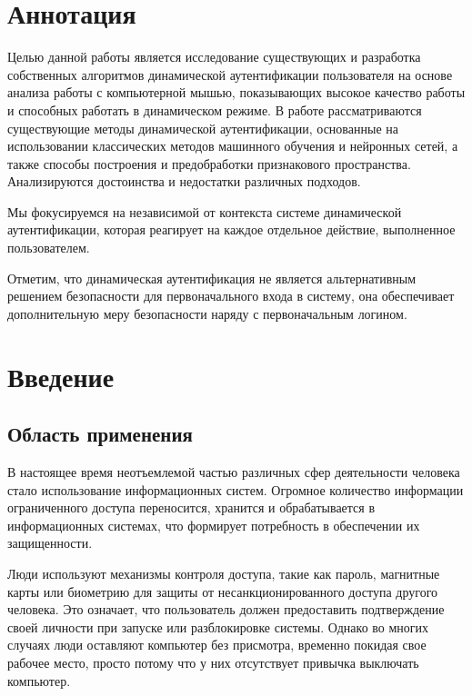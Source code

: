 \documentclass[12pt]{article}
\begin{document}
    \tableofcontents
    \newpage


    \onehalfspacing %


    \section{Аннотация}
    \label{sec:Annotation}

    \par Целью данной работы является исследование существующих и разработка собственных алгоритмов динамической аутентификации пользователя на основе анализа работы с компьютерной мышью, показывающих высокое качество работы и способных работать в динамическом режиме. В работе рассматриваются существующие методы динамической аутентификации, основанные на использовании классических методов машинного обучения и нейронных сетей, а также способы построения и предобработки признакового пространства. Анализируются достоинства и недостатки различных подходов.

    \par Мы фокусируемся на независимой от контекста системе динамической аутентификации, которая реагирует на каждое отдельное действие, выполненное пользователем.

    \par Отметим, что динамическая аутентификация не является альтернативным решением безопасности для первоначального входа в систему, она обеспечивает дополнительную меру безопасности наряду с первоначальным логином.

    \newpage



    \section{Введение}
    \label{sec:Intro}

    \subsection{Область применения}
    \label{sec:Intro:ApplicationArea}

    \par В настоящее время неотъемлемой частью различных сфер деятельности человека стало использование информационных систем. Огромное количество информации ограниченного доступа переносится, хранится и обрабатывается в информационных системах, что формирует потребность в обеспечении их защищенности.

    \par Люди используют механизмы контроля доступа, такие как пароль, магнитные карты или биометрию для защиты от несанкционированного доступа другого человека. Это означает, что пользователь должен предоставить подтверждение своей личности при запуске или разблокировке системы. Однако во многих случаях люди оставляют компьютер без присмотра, временно покидая свое рабочее место, просто потому что у них отсутствует привычка выключать компьютер.
\end{document}
